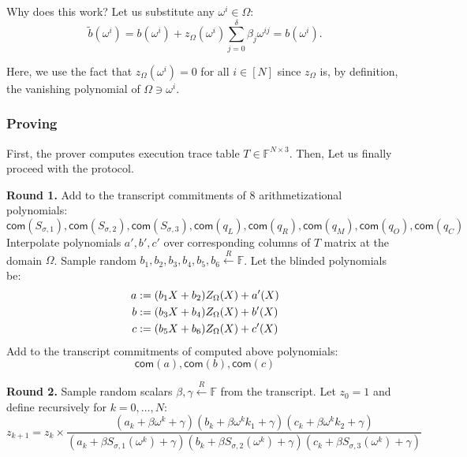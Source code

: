\documentclass[../lecture-notes.tex]{subfiles}
\begin{document}
Why does this work? Let us substitute any $\omega^i \in \Omega$:
\begin{equation*}
    \widetilde{b}(\omega^i) = b(\omega^i) + z_{\Omega}(\omega^i)\sum_{j=0}^{\delta}\beta_j\omega^{ij} = b(\omega^i).
\end{equation*}

Here, we use the fact that $z_{\Omega}(\omega^i) = 0$ for all $i \in [N]$ since $z_{\Omega}$ is, 
by definition, the vanishing polynomial of $\Omega \ni \omega^i$.

\subsubsection{Proving}
First, the prover computes execution trace table $T \in \mathbb{F}^{N\times 3}$.
Then,  Let us 
finally proceed with the protocol.

\textcolor{green!60!black}{\textbf{Round 1.}} Add to the transcript commitments
of 8 arithmetizational polynomials:
\begin{equation*}
    \mathsf{com}(S_{\sigma,1}), \mathsf{com}(S_{\sigma,2}), \mathsf{com}(S_{\sigma,3}), \mathsf{com}(q_L), \mathsf{com}(q_R), \mathsf{com}(q_M), \mathsf{com}(q_O), \mathsf{com}(q_C)
\end{equation*}
Interpolate polynomials $a', b', c'$ over corresponding columns of $T$ matrix at
the domain $\Omega$. Sample random $b_1, b_2, b_3, b_4, b_5, b_6 \xleftarrow{R}
\mathbb{F}$. Let the blinded polynomials be:
\begin{align*}
\centering
a &:= (b_1 X + b_2)Z_{\Omega}(X) + a'(X) \\
b &:= (b_3 X + b_4)Z_{\Omega}(X) + b'(X) \\
c &:= (b_5 X + b_6)Z_{\Omega}(X) + c'(X)
\end{align*}
Add to the transcript commitments of computed above polynomials:
\begin{equation*}
    \mathsf{com}(a), \mathsf{com}(b), \mathsf{com}(c)
\end{equation*}

\textcolor{green!60!black}{\textbf{Round 2.}}  Sample random scalars $\beta,
\gamma \xleftarrow{R} \mathbb{F}$ from the transcript. Let $z_0 = 1$ and define
recursively for $k = 0, \dots, N$:
\begin{equation*}
    z_{k+1} = z_k \times \frac{(a_k + \beta \omega^{k} + \gamma) (b_k + \beta \omega^{k}k_1 + \gamma) (c_k + \beta \omega^{k}k_2 + \gamma)}{(a_k + \beta S_{\sigma,1}(\omega^{k}) + \gamma) (b_k + \beta S_{\sigma,2}(\omega^{k}) + \gamma) (c_k + \beta S_{\sigma,3}(\omega^{k}) + \gamma)}     
\end{equation*}
\end{document}

